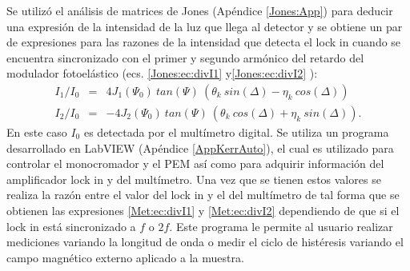 \newline 
\par Se utiliz\'o el an\'alisis de matrices de Jones (Ap\'endice \ref{Jones:App}) para deducir una expresi\'on de la intensidad de la luz que llega al detector y  se obtiene un par de expresiones para las razones de la intensidad que detecta el lock in cuando se encuentra sincronizado con el primer y segundo arm\'onico del retardo del modulador fotoel\'astico (ecs. \ref{Jones:ec:divI1} y\ref{Jones:ec:divI2} ):
\begin{eqnarray}
I_1/I_0 &=& 4 J_1 (\Psi_0) ~tan(\varPsi) ~(\theta_k ~sin(\Delta) - \eta_k~ cos(\Delta)) \label{Met:ec:divI1}\\
I_2/I_0 &=& -4 J_2 (\Psi_0) ~tan(\varPsi) ~(\theta_k~cos(\Delta) + \eta_k ~ sin(\Delta)) \label{Met:ec:divI2}.
\end{eqnarray}
En este caso $I_0$ es detectada por el mult\'imetro digital. Se utiliza un programa desarrollado en LabVIEW (Ap\'endice \ref{AppKerrAuto}), el cual es utilizado para controlar el monocromador  y el PEM as\'i como para adquirir informaci\'on del amplificador lock in y del mult\'imetro. Una vez que se tienen estos valores se realiza la raz\'on entre el valor del lock in y el del mult\'imetro de tal forma que se obtienen las expresiones \ref{Met:ec:divI1} y \ref{Met:ec:divI2} dependiendo de que si el lock in est\'a sincronizado a $f$ o $2f$.  Este programa le permite al usuario realizar mediciones variando la longitud de onda o medir el ciclo de hist\'eresis variando el campo magn\'etico externo aplicado a la muestra.
